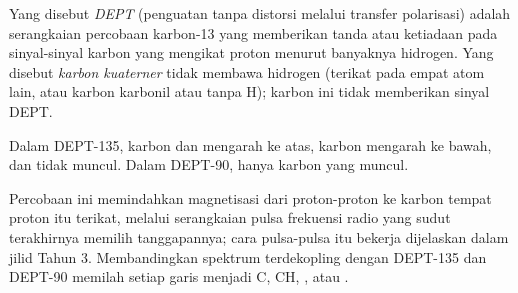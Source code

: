 \begin{definition}[DEPT]\label{def:b2:structure-determination:dept}
Yang disebut \emph{DEPT} (penguatan tanpa distorsi melalui transfer
polarisasi) adalah serangkaian percobaan karbon-13 yang
memberikan tanda atau ketiadaan pada sinyal-sinyal karbon yang mengikat
proton menurut banyaknya hidrogen. Yang disebut \emph{karbon
kuaterner} tidak membawa hidrogen (terikat pada
empat atom lain, atau karbon karbonil atau  tanpa H); karbon ini
tidak memberikan sinyal DEPT.
\end{definition}

\begin{proposition}\label{prop:b2:structure-determination:dept}
Dalam DEPT-135, karbon  dan  mengarah ke atas, karbon
 mengarah ke bawah, dan  tidak muncul. Dalam
DEPT-90, hanya karbon  yang muncul.
\end{proposition}

\admitted

Percobaan ini memindahkan magnetisasi dari proton-proton ke karbon tempat
proton itu terikat, melalui serangkaian pulsa frekuensi radio yang sudut
terakhirnya memilih tanggapannya; cara pulsa-pulsa itu bekerja dijelaskan
dalam jilid Tahun 3. Membandingkan spektrum terdekopling dengan DEPT-135 dan
DEPT-90 memilah setiap garis menjadi C, CH, , atau .

